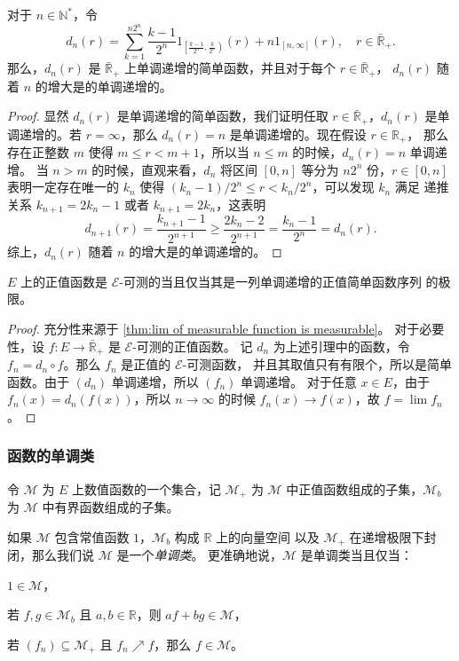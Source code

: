 \documentclass[fontset=none]{Notes}
\begin{document}
\begin{lemma}
  对于 $n\in \mathbb{N}^*$，令
  \[
    d_n(r)=\sum_{k=1}^{n2^n}\frac{k-1}{2^n}1_{\left[\frac{k-1}{2^n},\frac{k}{2^n}\right)}(r)
    +n1_{[n,\infty]}(r),\quad r\in \bar{\mathbb{R}}_+.
  \]
  那么，$d_n(r)$ 是 $\bar{\mathbb{R}}_+$ 上单调递增的简单函数，并且对于每个 $r\in\bar{\mathbb{R}}_+$，
  $d_n(r)$ 随着 $n$ 的增大是的单调递增的。
\end{lemma}
\begin{proof}
  显然 $d_n(r)$ 是单调递增的简单函数，我们证明任取 $r\in \bar{\mathbb{R}}_+$，$d_n(r)$
  是单调递增的。若 $r=\infty$，那么 $d_n(r)=n$ 是单调递增的。现在假设 $r\in \mathbb{R}_+$，
  那么存在正整数 $m$ 使得 $m\leq r<m+1$，所以当 $n\leq m$ 的时候，$d_n(r)=n$ 单调递增。
  当 $n>m$ 的时候，直观来看，$d_n$ 将区间 $[0,n]$ 等分为 $n2^{n}$ 份，$r\in [0,n]$
  表明一定存在唯一的 $k_n$ 使得 $(k_n-1)/2^n\leq r <k_n/2^n$，可以发现 $k_{n}$ 满足 
  递推关系 $k_{n+1}=2k_n-1$ 或者 $k_{n+1}=2k_n$，这表明
  \[
    d_{n+1}(r)= \frac{k_{n+1}-1}{2^{n+1}}\geq\frac{2k_n-2}{2^{n+1}}=\frac{k_n-1}{2^n}=d_n(r).
  \]
  综上，$d_n(r)$ 随着 $n$ 的增大是的单调递增的。
\end{proof}

\begin{theorem}\label{thm:approximation of measurable function}
  $E$ 上的正值函数是 $\mathcal{E}$-可测的当且仅当其是一列单调递增的正值简单函数序列
  的极限。
\end{theorem}
\begin{proof}
  充分性来源于 \autoref{thm:lim of measurable function is measurable}。
  对于必要性，设 $f:E\to\bar{\mathbb{R}}_+$ 是 $\mathcal{E}$-可测的正值函数。
  记 $d_n$ 为上述引理中的函数，令 $f_n=d_n\circ f$。那么 $f_n$ 是正值的 $\mathcal{E}$-可测函数，
  并且其取值只有有限个，所以是简单函数。由于 $(d_n)$ 单调递增，所以 $(f_n)$ 单调递增。
  对于任意 $x\in E$，由于 $f_n(x)=d_n(f(x))$，所以 $n\to\infty$ 的时候
  $f_n(x)\to f(x)$，故 $f=\lim f_n$。
\end{proof}

\subsubsection{函数的单调类}

令 $\mathcal{M}$ 为 $E$ 上数值函数的一个集合，记 $\mathcal{M}_+$ 为 $\mathcal{M}$
中正值函数组成的子集，$\mathcal{M}_b$ 为 $\mathcal{M}$ 中有界函数组成的子集。

如果 $\mathcal{M}$ 包含常值函数 $1$，$\mathcal{M}_b$ 构成 $\mathbb{R}$ 上的向量空间
以及 $\mathcal{M}_+$ 在递增极限下封闭，那么我们说 $\mathcal{M}$ 是一个\emph{单调类}。
更准确地说，$\mathcal{M}$ 是单调类当且仅当：
\begin{alphenum}
  \item $1\in \mathcal{M}$，
  \item 若 $f,g\in \mathcal{M}_b$ 且 $a,b\in \mathbb{R}$，则 $af+bg\in \mathcal{M}$，
  \item 若 $(f_n)\subseteq \mathcal{M}_+$ 且 $f_n\nearrow f$，那么
  $f\in \mathcal{M}$。
\end{alphenum}
\end{document}
